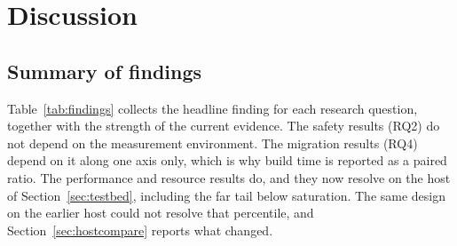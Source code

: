 \documentclass[english,oneside,a4paper,censored,csm,software-track-2020]{HYthesisML}
\begin{document}
\chapter{Discussion\label{chapter:discussion}}

\section{Summary of findings}
Table~\ref{tab:findings} collects the headline finding for each research question, together with the
strength of the current evidence. The safety results (RQ2) do not depend on the measurement
environment. The migration results (RQ4) depend on it along one axis only, which is why build
time is reported as a paired ratio. The performance and resource results do, and they now
resolve on the host of Section~\ref{sec:testbed}, including the far tail below saturation. The
same design on the earlier host could not resolve that percentile, and
Section~\ref{sec:hostcompare} reports what changed.
\end{document}
